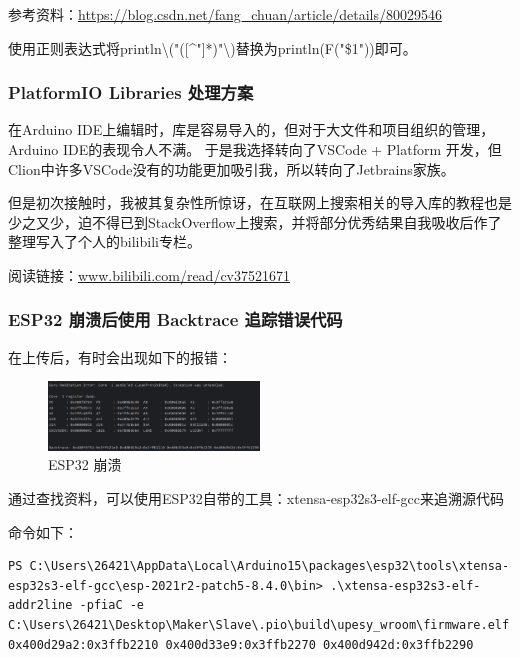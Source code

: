 参考资料：\href{https://blog.csdn.net/fang\_chuan/article/details/80029546}{\underline{https://blog.csdn.net/fang\_chuan/article/details/80029546}}

使用正则表达式将println\textbackslash("([\textasciicircum"]*)"\textbackslash)替换为println(F("\$1"))即可。

\subsubsection{PlatformIO Libraries 处理方案}

在Arduino IDE上编辑时，库是容易导入的，但对于大文件和项目组织的管理，Arduino IDE的表现令人不满。
于是我选择转向了VSCode + Platform 开发，但Clion中许多VSCode没有的功能更加吸引我，所以转向了Jetbrains家族。

但是初次接触时，我被其复杂性所惊讶，在互联网上搜索相关的导入库的教程也是少之又少，迫不得已到StackOverflow上搜索，并将部分优秀结果自我吸收后作了整理写入了个人的bilibili专栏。

阅读链接：\href{https://www.bilibili.com/read/cv37521671}{\underline{www.bilibili.com/read/cv37521671}}

\subsubsection{ESP32 崩溃后使用 Backtrace 追踪错误代码}

在上传后，有时会出现如下的报错：

\begin{figure} [H]
    \centering
    \includegraphics[width=0.5\textwidth]{img/ESP32Error.png}
    \caption{ESP32 崩溃}
    \label{fig:ESP32_crash}
\end{figure}

通过查找资料，可以使用ESP32自带的工具：xtensa-esp32s3-elf-gcc来追溯源代码

命令如下：
\begin{lstlisting}
PS C:\Users\26421\AppData\Local\Arduino15\packages\esp32\tools\xtensa-esp32s3-elf-gcc\esp-2021r2-patch5-8.4.0\bin> .\xtensa-esp32s3-elf-addr2line -pfiaC -e C:\Users\26421\Desktop\Maker\Slave\.pio\build\upesy_wroom\firmware.elf 0x400d29a2:0x3ffb2210 0x400d33e9:0x3ffb2270 0x400d942d:0x3ffb2290
\end{lstlisting}

